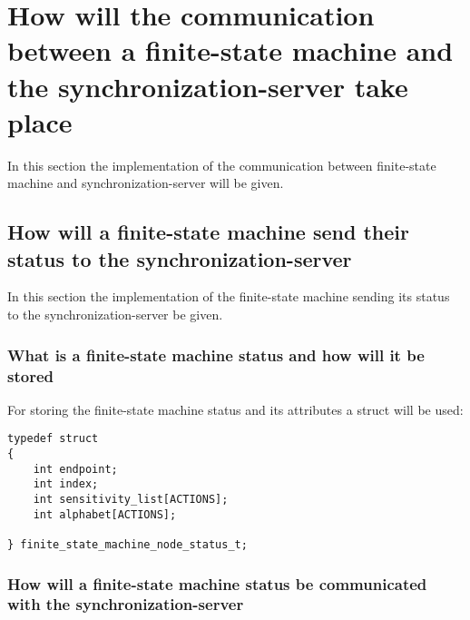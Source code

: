 \hypertarget{how-will-the-communication-between-a-finite-state-machine-and-the-synchronization-server-take-place}{%
\section{How will the communication between a finite-state machine and
the synchronization-server take
place}\label{how-will-the-communication-between-a-finite-state-machine-and-the-synchronization-server-take-place}}

In this section the implementation of the communication between
finite-state machine and synchronization-server will be given.

\hypertarget{how-will-a-finite-state-machine-send-their-status-to-the-synchronization-server}{%
\subsection{How will a finite-state machine send their status to the
synchronization-server}\label{how-will-a-finite-state-machine-send-their-status-to-the-synchronization-server}}

In this section the implementation of the finite-state machine sending
its status to the synchronization-server be given.

\hypertarget{what-is-a-finite-state-machine-status-and-how-will-it-be-stored}{%
\subsubsection{What is a finite-state machine status and how will it be
stored}\label{what-is-a-finite-state-machine-status-and-how-will-it-be-stored}}

For storing the finite-state machine status and its attributes a struct
will be used:

\begin{verbatim}
typedef struct
{
    int endpoint;
    int index;
    int sensitivity_list[ACTIONS];
    int alphabet[ACTIONS];

} finite_state_machine_node_status_t;
\end{verbatim}

\hypertarget{how-will-a-finite-state-machine-status-be-communicated-with-the-synchronization-server}{%
\subsubsection{How will a finite-state machine status be communicated
with the
synchronization-server}\label{how-will-a-finite-state-machine-status-be-communicated-with-the-synchronization-server}}

